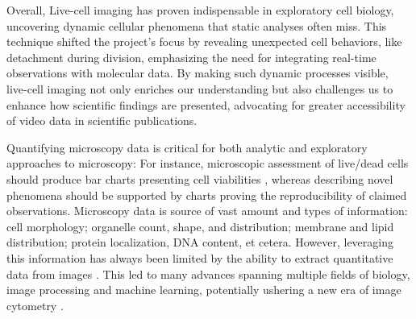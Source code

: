 Overall, Live-cell imaging has proven indispensable in exploratory cell biology,
uncovering dynamic cellular phenomena that static analyses often miss. This
technique shifted the project’s focus by revealing unexpected cell behaviors,
like detachment during division, emphasizing the need for integrating real-time
observations with molecular data. By making such dynamic processes visible,
live-cell imaging not only enriches our understanding but also challenges us
to enhance how scientific findings are presented, advocating for greater
accessibility of video data in scientific publications.


%
\label{sec:discussion_quantifying_microscopy}%
Quantifying microscopy data is critical for both analytic and exploratory
approaches to microscopy: For instance, microscopic assessment of live/dead
cells should produce bar charts presenting cell viabilities
\cite{spaepenDigitalImageProcessing2011}, whereas describing novel phenomena
should be supported by charts proving the reproducibility of claimed
observations. Microscopy data is source of vast amount and types of information:
cell morphology; organelle count, shape, and distribution; membrane and lipid
distribution; protein localization, DNA content, et cetera. However, leveraging
this information has always been limited by the ability to extract quantitative
data from images \cite{galbraithPumpingVolume2023}. This led to many advances
spanning multiple fields of biology, image processing and machine learning,
potentially ushering a new era of image cytometry
\cite{guptaDeepLearningImage2019}.



